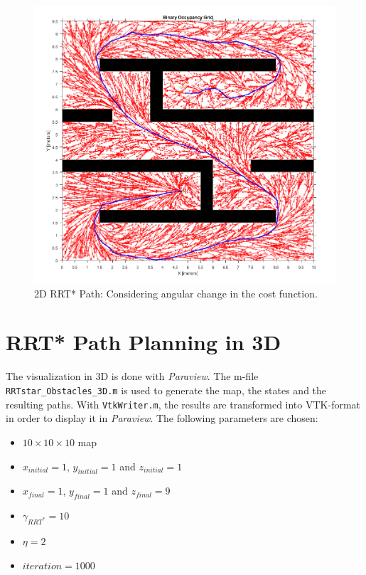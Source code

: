 \begin{figure} [h]
	\centering
	\includegraphics[width=1\textwidth]{images/RRTstar_w2.png}
	\caption{2D RRT* Path: Considering angular change in the cost function.}
	\label{pics:RRTstar_w2}
\end{figure}

\section{RRT* Path Planning in 3D}

The visualization in 3D is done with \textit{Paraview}. The m-file \verb+RRTstar_Obstacles_3D.m+ is used to generate the map, the states and the resulting paths. With \verb+VtkWriter.m+, the results are transformed into VTK-format in order to display it in \textit{Paraview}. The following parameters are chosen:

\begin{itemize}
	\item
	$10 \times 10 \times 10$ map
	\item
	$x_{initial}=1$, $y_{initial}=1$ and $z_{initial}=1$
	\item
	$x_{final}=1$, $y_{final}=1$ and $z_{final}=9$
	\item 
	$\gamma_{RRT^{*}}=10$
	\item
	$\eta=2$
	\item
	$iteration=1000$
\end{itemize}

